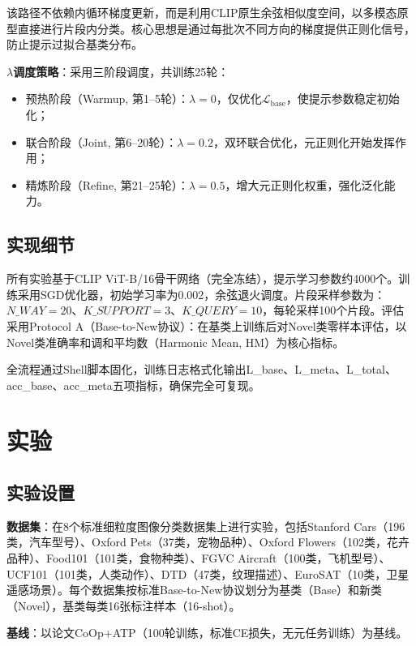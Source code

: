 \documentclass[10pt,a4paper]{ctexart}
\begin{document}
该路径不依赖内循环梯度更新，而是利用CLIP原生余弦相似度空间，以多模态原型直接进行片段内分类。核心思想是通过每批次不同方向的梯度提供正则化信号，防止提示过拟合基类分布。

\textbf{$\lambda$调度策略}：采用三阶段调度，共训练25轮：
\begin{itemize}[nosep]
    \item 预热阶段（Warmup, 第1--5轮）：$\lambda = 0$，仅优化$\mathcal{L}_{\text{base}}$，使提示参数稳定初始化；
    \item 联合阶段（Joint, 第6--20轮）：$\lambda = 0.2$，双环联合优化，元正则化开始发挥作用；
    \item 精炼阶段（Refine, 第21--25轮）：$\lambda = 0.5$，增大元正则化权重，强化泛化能力。
\end{itemize}

\subsection{实现细节}

所有实验基于CLIP ViT-B/16骨干网络（完全冻结），提示学习参数约4000个。训练采用SGD优化器，初始学习率为0.002，余弦退火调度。片段采样参数为：$N\_WAY{=}20$、$K\_SUPPORT{=}3$、$K\_QUERY{=}10$，每轮采样100个片段。评估采用Protocol A（Base-to-New协议）：在基类上训练后对Novel类零样本评估，以Novel类准确率和调和平均数（Harmonic Mean, HM）为核心指标。

全流程通过Shell脚本固化，训练日志格式化输出L\_base、L\_meta、L\_total、acc\_base、acc\_meta五项指标，确保完全可复现。

\section{实验}

\subsection{实验设置}

\textbf{数据集}：在8个标准细粒度图像分类数据集上进行实验，包括Stanford Cars（196类，汽车型号）、Oxford Pets（37类，宠物品种）、Oxford Flowers（102类，花卉品种）、Food101（101类，食物种类）、FGVC Aircraft（100类，飞机型号）、UCF101（101类，人类动作）、DTD（47类，纹理描述）、EuroSAT（10类，卫星遥感场景）。每个数据集按标准Base-to-New协议划分为基类（Base）和新类（Novel），基类每类16张标注样本（16-shot）。

\textbf{基线}：以论文CoOp+ATP（100轮训练，标准CE损失，无元任务训练）为基线。
\end{document}
